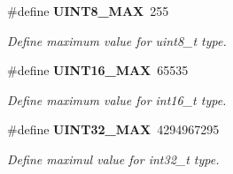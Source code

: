 \begin{DoxyCompactItemize}
\#define \textbf{ U\+I\+N\+T8\+\_\+\+M\+AX}~255
\begin{DoxyCompactList}\small\item\em Define maximum value for uint8\+\_\+t type. \end{DoxyCompactList}\item 
\mbox{\label{stdint_8h_a3ea490c9b3617d4479bd80ef93cd5602}} 
\#define \textbf{ U\+I\+N\+T16\+\_\+\+M\+AX}~65535
\begin{DoxyCompactList}\small\item\em Define maximum value for int16\+\_\+t type. \end{DoxyCompactList}\item 
\mbox{\label{stdint_8h_ab5eb23180f7cc12b7d6c04a8ec067fdd}} 
\#define \textbf{ U\+I\+N\+T32\+\_\+\+M\+AX}~4294967295
\begin{DoxyCompactList}\small\item\em Define maximul value for int32\+\_\+t type. \end{DoxyCompactList}\end{DoxyCompactItemize}
